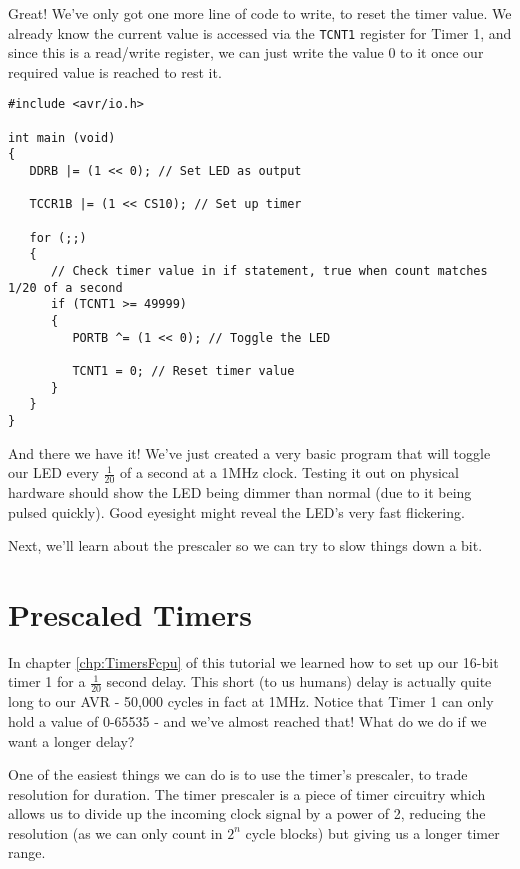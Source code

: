 \documentclass[a4paper,oneside,notitlepage]{book}
\begin{document}
Great! We've only got one more line of code to write, to reset the timer value. We already know the current value is accessed via the \texttt{TCNT1} register for Timer 1, and since this is a read/write register, we can just write the value 0 to it once our required value is reached to rest it.

\begin{center}
\begin{lstlisting}
#include <avr/io.h>

int main (void)
{
   DDRB |= (1 << 0); // Set LED as output

   TCCR1B |= (1 << CS10); // Set up timer

   for (;;)
   {
      // Check timer value in if statement, true when count matches 1/20 of a second
      if (TCNT1 >= 49999)
      {
         PORTB ^= (1 << 0); // Toggle the LED

         TCNT1 = 0; // Reset timer value
      }
   }
}
\end{lstlisting}
\end{center}

And there we have it! We've just created a very basic program that will toggle our LED every \(\frac{1}{20}\) of a second at a 1MHz clock. Testing it out on physical hardware should show the LED being dimmer than normal (due to it being pulsed quickly). Good eyesight might reveal the LED's very fast flickering.

Next, we'll learn about the prescaler so we can try to slow things down a bit.


\label{chp:PrescaledTimers}
\chapter{Prescaled Timers}

In chapter \ref{chp:TimersFcpu} of this tutorial we learned how to set up our 16-bit timer 1 for a \(\frac{1}{20}\) second delay. This short (to us humans) delay is actually quite long to our AVR - 50,000 cycles in fact at 1MHz. Notice that Timer 1 can only hold a value of 0-65535 - and we've almost reached that! What do we do if we want a longer delay?

One of the easiest things we can do is to use the timer's prescaler, to trade resolution for duration. The timer prescaler is a piece of timer circuitry which allows us to divide up the incoming clock signal by a power of 2, reducing the resolution (as we can only count in \(2^n\) cycle blocks) but giving us a longer timer range.
\end{document}
